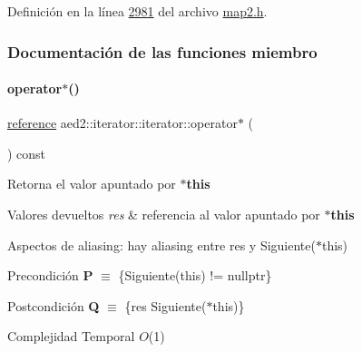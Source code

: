Definición en la línea \hyperlink{map2_8h_source_l02981}{2981} del archivo \hyperlink{map2_8h_source}{map2.\+h}.



\subsubsection{Documentación de las funciones miembro}
\mbox{\label{classaed2_1_1iterator_1_1iterator_a5d87de9e96d5efd0456e8f7aec240b8d_a5d87de9e96d5efd0456e8f7aec240b8d}} 
\paragraph{\texorpdfstring{operator$\ast$()}{operator*()}}
{\footnotesize\ttfamily \hyperlink{classaed2_1_1iterator_1_1iterator_a91be74b60dfc3eabfa5a69d9aa068959_a91be74b60dfc3eabfa5a69d9aa068959}{reference} aed2\+::iterator\+::iterator\+::operator$\ast$ (\begin{DoxyParamCaption}{ }\end{DoxyParamCaption}) const\hspace{0.3cm}{\ttfamily [inline]}}



Retorna el valor apuntado por {\bfseries $\ast$this} 


\begin{DoxyRetVals}{Valores devueltos}
{\em res} & referencia al valor apuntado por {\bfseries $\ast$this}\\
\hline
\end{DoxyRetVals}
\begin{DoxyParagraph}{Aspectos de aliasing\+:}
hay aliasing entre res y Siguiente($\ast$this)
\end{DoxyParagraph}
\begin{DoxyPrecond}{Precondición}
{\bfseries P} $\equiv$ \{Siguiente(this) != nullptr\} 
\end{DoxyPrecond}
\begin{DoxyPostcond}{Postcondición}
{\bfseries Q} $\equiv$ \{res  Siguiente($\ast$this)\}
\end{DoxyPostcond}

\begin{DoxyDescription}
\item[Complejidad Temporal]$O$(1)
\end{DoxyDescription}

